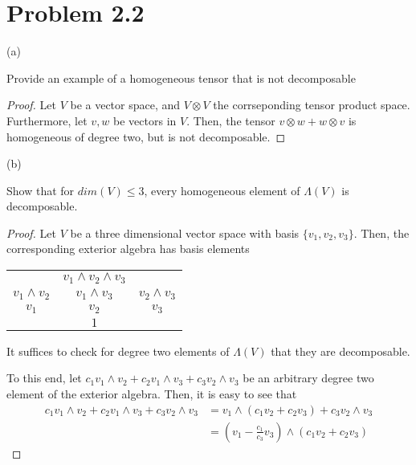 \documentclass[paper=a4, fontsize=11pt]{scrartcl} %
\numberwithin{equation}{section} %
\numberwithin{figure}{section} %
\numberwithin{table}{section} %
\begin{document}


\section*{Problem 2.2}
(a)

Provide an example of a homogeneous tensor that is not decomposable

\begin{proof}
Let $V$ be a vector space, and $V \otimes V$ the corrseponding tensor product space.
Furthermore, let $v, w$ be vectors in $V$.
Then, the tensor $v \otimes w + w \otimes v$ is homogeneous of degree two, but is not decomposable.
\end{proof}

(b)

Show that for $dim(V) \leq 3$, every homogeneous element of $\Lambda (V)$ is decomposable.

\begin{proof}

Let $V$ be a three dimensional vector space with basis $\{v_1, v_2, v_3\}$.
Then, the corresponding exterior algebra has basis elements
\\
\begin{center}
\begin{tabular}{c c c}
                & $v_1 \wedge v_2 \wedge v_3$ &\\
$v_1 \wedge v_2$  & $v_1 \wedge v_3$  & $v_2 \wedge v_3$\\
$v_1$             & $v_2$               & $v_3$\\
                  & $1$ &
\end{tabular}
\end{center}

It suffices to check for degree two elements of $\Lambda(V)$ that they are decomposable.

To this end, let $c_1 v_1 \wedge v_2 + c_2 v_1 \wedge v_3 + c_3 v_2 \wedge v_3$ be an arbitrary
degree two element of the exterior algebra.
Then, it is easy to see that 
\[
\begin{aligned}
c_1 v_1 \wedge v_2 + c_2 v_1 \wedge v_3 + c_3 v_2 \wedge v_3 & = v_1 \wedge (c_1 v_2 + c_2 v_3) + c_3 v_2 \wedge v_3\\
& = (v_1 -\frac{c_1}{c_3}v_3) \wedge (c_1v_2 + c_2v_3)
\end{aligned}
\]

\end{proof}
\end{document}
